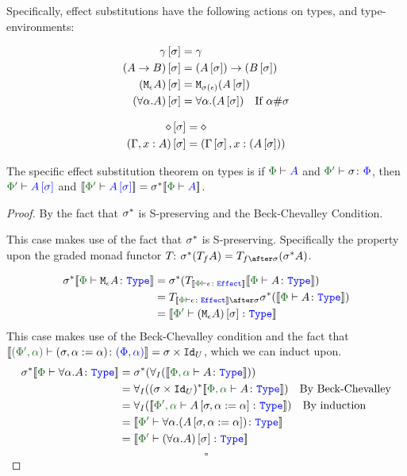 \documentclass{Report}
\begin{document}
Specifically, effect substitutions have the following actions on types, and type-environments:

\begin{align*}
    \gamma\left[\sigma\right] &= \gamma \\
    (A\rightarrow B)\left[\sigma\right] &= (A\left[\sigma\right])\rightarrow (B\left[\sigma\right]) \\
    (\texttt{M}_{\epsilon}{A})\left[\sigma\right] &= \texttt{M}_{\sigma(\epsilon)}{(A\left[\sigma\right])}\\
    (\forall \alpha. A)\left[\sigma\right] &= \forall \alpha. (A\left[\sigma\right])\quad\text{If $\alpha\#\sigma$}
\end{align*}

\begin{align*}
    \diamond\left[\sigma\right] & = \diamond \\
    (\Gamma, x: A)\left[\sigma\right] &= (\Gamma\left[\sigma\right], x:(A\left[\sigma\right]))\\
\end{align*}


\begin{theorem}
    The specific effect substitution theorem on types is if $\wellformed{\P}{A}$ and $\typerelation{\P'}{\si}{\P}$, then $\wellformed{\P'}{A\ssi}$ and $\deno{\wellformed{\P'}{A\ssi}} = \si\star\deno{\wellformed{\P}{A}}$.
\end{theorem}

\begin{proof}
   By the fact that $\sigma^*$ is S-preserving and the Beck-Chevalley Condition.

    This case makes use of the fact that $\sigma^*$ is S-preserving. Specifically the property upon the graded monad functor $T_{}{}$: $\si\star(\T{f}{A}) = \T{f\after\si}{(\si\star A)}$.


    \begin{align*}
        \si\star\deno{\typerelation{\P}{\mea}{\type}} & =  \si\star(\T{\deno{\typerelation{\P}{\e}{\effect}}}{\deno{\typerelation{\P}{A}{\type}}})\\
        &= \T{\deno{\typerelation{\P}{\e}{\effect}}\after\si}{\si\star(\deno{\typerelation{\P}{A}{\type}})}\\
        & = \deno{\typerelation{\P'}{(\mea)\ssi}{\type}}
    \end{align*}
    This case makes use of the Beck-Chevalley condition and the fact that $\deno{\typerelation{(\P', \a)}{(\si, \a\setto\a)}{(\P, \a)}} = \si\times\Id{U}$, which we can induct upon.
        \begin{align*}
            \si\star\deno{\typerelation{\P}{\all{\a}A}{\type}} & = \si\star(\allI(\deno{\typerelation{\P,\a}{A}{\type}}))\\
            & = \allI((\si\times\Id{U})\star\deno{\typerelation{\P,\a}{A}{\type}})\qt{By Beck-Chevalley}\\
            & = \allI(\deno{\typerelation{\P',\a}{A\sub{\si, \a\setto\a}}{\type}})\qt{By induction}\\
            & = \deno{\typerelation{\P'}{\all{\a}{(A\sub{\si, \a\setto\a})}}{\type}}\\
            & = \deno{\typerelation{\P'}{(\all{\a}{A})\ssi}{\type}}\\
        \end{align*}
        $$\square$$
\end{proof}
\end{document}
